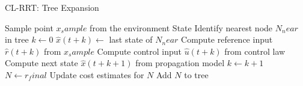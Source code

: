 \begin{algorithm}
\caption{CL-RRT: Tree Expansion}
\label{alg:clrrt_expansion}
\begin{algorithmic}[1]
\State Sample point $x_sample$ from the environment
State Identify nearest node $N_near$ in tree
\State $k \gets 0$
\State $\hat{x}(t+k) \gets $ last state of $N_near$
	\State Compute reference input $\hat{r}(t+k)$ from $x_sample$
	\State Compute control input $\hat{u}(t+k)$ from control law
	\State Compute next state $\hat{x}(t+k+1)$ from propagation model 
	\State $k \gets k+1$
\EndWhile
$N \gets r_final$
	\State Update cost estimates for $N$
	\State Add $N$ to tree
\EndFor
\end{algorithmic}
\end{algorithm}